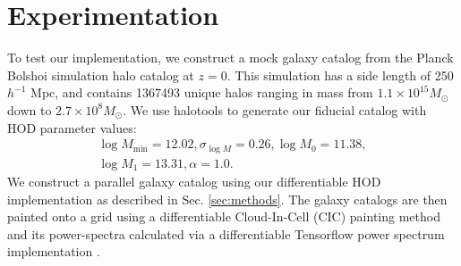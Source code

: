 \documentclass[a4paper,usenatbib]{mnras}
\newcommand{\FL}[1]{{\color{magenta}FL: #1}}
\newcommand{\CH}[1]{{\color{green}CH: #1}}
\newcommand{\BH}[1]{{\color{red}BH: #1}}
\begin{document}

\section{Experimentation}
\label{sec:exp}


To test our implementation, we construct a mock galaxy catalog from the Planck Bolshoi simulation halo catalog
\citep{2011Bolshoi} at $z=0$. This simulation has a  side length of 250 $h^{-1}$ Mpc, and contains 1367493 unique halos ranging in mass from $1.1 \times 10^{15} M_\odot$ down to $2.7 \times 10^{8} M_\odot$. We use halotools \citep{2016MNRAS.460.2552H} to generate our fiducial catalog with 
\cite{2007zheng} HOD parameter values: 
\begin{gather*}
    \log{M_\textrm{min}}=12.02,  \sigma_{\log{M}}=0.26, \log M_0 = 11.38, \\  \log{M_1}=13.31, \alpha = 1.0.
\end{gather*}
We construct a parallel galaxy catalog using our differentiable HOD implementation as described in Sec. \ref{sec:methods}. The galaxy catalogs are then painted onto a grid using a differentiable Cloud-In-Cell (CIC) painting method \citep{2020arXiv201011847M} and its power-spectra calculated via a differentiable Tensorflow power spectrum implementation \citep{2021TARDISII}.
\end{document}
